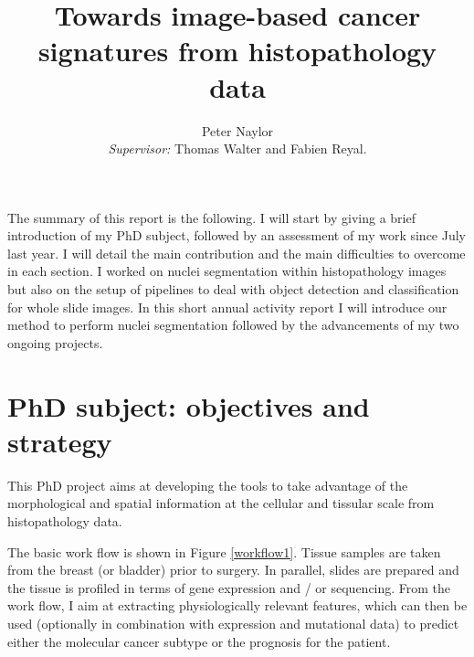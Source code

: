 \documentclass[a4paper,10pt,twocolumn]{article}
\begin{document}
\title{Towards image-based cancer signatures from histopathology data}


\author{Peter Naylor \\ {\small \textit{Supervisor:} Thomas Walter and Fabien Reyal.}}


\maketitle



The summary of this report is the following. I will start by giving a brief introduction of my PhD subject, followed by an assessment of my work since July last year. I will detail the main contribution and the main difficulties to overcome in each section.  I worked on nuclei segmentation within histopathology images but also on the setup of pipelines to deal with object detection and classification for whole slide images. In this short annual activity report I will introduce our method to perform nuclei segmentation followed by the advancements of my two ongoing projects.


\section{PhD subject: objectives and strategy}

This  PhD  project aims at developing the tools to take advantage of
the morphological and spatial information at the cellular and tissular
scale from histopathology data. 


The basic work flow is shown in Figure \ref{workflow1}. Tissue samples
are taken from the breast (or bladder) prior to surgery. In parallel, slides are
prepared and the tissue is profiled in terms of gene expression and /
or sequencing. From the work flow, I aim at extracting physiologically
relevant features, which can then be used (optionally in combination with
expression and mutational data) to predict either the molecular
cancer subtype or the prognosis for the patient. 
\end{document}
